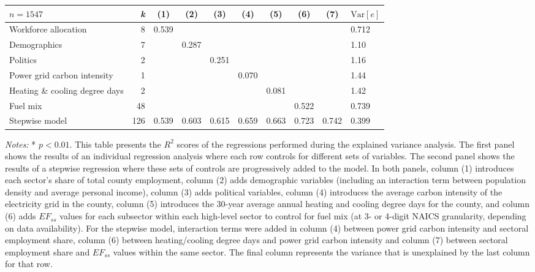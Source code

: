 \begin{threeparttable}
    \scriptsize
    \begin{tabular}{l r c c c c c c c l}
        \toprule
         $n=1547$ & \multicolumn{1}{r}{\textit{k}} & (1)   & (2)   & (3)   & (4) & (5) & (6) & (7) & \multicolumn{1}{r}{$\mathrm{Var}[e]$} \\
        \midrule
        Workforce allocation            & 8 & 0.539\tnote{*} & & & & & & & 0.712 \\
        Demographics                    & 7 & & 0.287\tnote{*} & & & & & & 1.10\\
        Politics                        & 2 & & & 0.251\tnote{*} & & & & & 1.16 \\
        Power grid carbon intensity     & 1 & & & & 0.070\tnote{*} & & & & 1.44\\
        Heating \& cooling degree days  & 2 & & & & & 0.081\tnote{*} & & & 1.42\\
        Fuel mix                        & 48 & & & & & & 0.522\tnote{*} & & 0.739\\
        \midrule
        Stepwise model & 126 & 0.539\tnote{*} & 0.603\tnote{*} & 0.615\tnote{*} & 0.659\tnote{*} & 0.663\tnote{*} & 0.723\tnote{*} & 0.742\tnote{*} & 0.399\\
        \bottomrule
    \end{tabular}
    \begin{tablenotes}
    \item\scriptsize\textit{Notes:} * $p < 0.01$. This table presents the $R^2$ scores of the regressions performed during the explained variance analysis. The first panel shows the results of an individual regression analysis where each row controls for different sets of variables. The second panel shows the results of a stepwise regression where these sets of controls are progressively added to the model. In both panels, column (1) introduces each sector's share of total county employment, column (2) adds demographic variables (including an interaction term between population density and average personal income), column (3) adds political variables, column (4) introduces the average carbon intensity of the electricity grid in the county, column (5) introduces the 30-year average annual heating and cooling degree days for the county, and column (6) adds $EF_{ss}$ values for each subsector within each high-level sector to control for fuel mix (at 3- or 4-digit NAICS granularity, depending on data availability). For the stepwise model, interaction terms were added in column (4) between power grid carbon intensity and sectoral employment share, column (6) between heating/cooling degree days and power grid carbon intensity and column (7) between sectoral employment share and $EF_{ss}$ values within the same sector. The final column represents the variance that is unexplained by the last column for that row.
    \end{tablenotes}
\end{threeparttable}